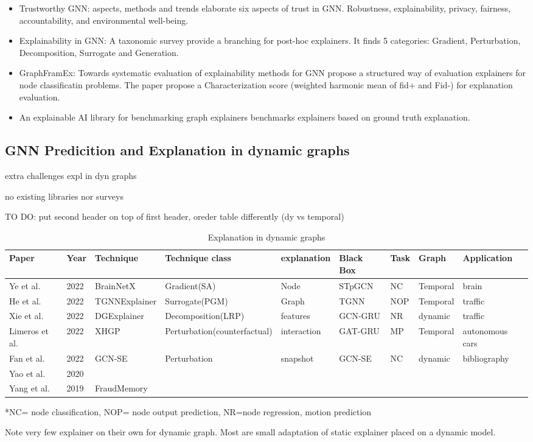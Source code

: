 \begin{itemize}
    
    \item Trustworthy GNN: aspects, methods and trends\cite{trustworthy} elaborate six aspects of trust in GNN. Robustness, explainability, privacy, fairness, accountability, and environmental well-being.
    \item Explainability in GNN: A taxonomic survey \cite{expl_survey} provide a branching for post-hoc explainers. It finds 5 categories: Gradient, Perturbation, Decomposition, Surrogate and Generation.
    \item GraphFramEx: Towards systematic evaluation of explainability methods for GNN\cite{graphframex} propose a structured way of evaluation explainers for node classificatin problems. The paper propose a Characterization score (weighted harmonic mean of fid+ and Fid-) for explanation evaluation.
    \item An explainable AI library for benchmarking graph explainers\cite{explainable_AI} benchmarks explainers based on ground truth explanation.

\end{itemize}


\subsection{GNN Predicition and Explanation in dynamic graphs}
extra challenges expl in dyn graphs

no existing libraries nor surveys

TO DO: put second header on top of first header, oreder table differently (dy vs temporal)

\begin{table}
\caption{Explanation in dynamic graphs}\label{tab1}
\begin{tabular}{|l|l|l|l|l|l|l|l|l|}
\hline
Paper &  Year & Technique & Technique class & explanation & Black Box & Task & Graph & Application \\
\hline
 Ye et al.\cite{BrainNetX}& 2022 & BrainNetX & Gradient(SA) & Node & STpGCN & NC & Temporal & brain \\
 He et al.\cite{PGM}& 2022& TGNNExplainer & Surrogate(PGM) & Graph & TGNN &  NOP & Temporal & traffic\\
 Xie et al.\cite{DGExpl}& 2022 & DGExplainer & Decomposition(LRP) & features & GCN-GRU & NR & dynamic & traffic\\
 Limeros et al.\cite{XHGP}& 2022 & XHGP & Perturbation(counterfactual) & interaction & GAT-GRU & MP &Temporal & autonomous cars\\
 Fan et al.\cite{gcn-se}& 2022 & GCN-SE & Perturbation & snapshot & GCN-SE & NC & dynamic & bibliography\\
 Yao et al.\cite{}& 2020 &  \\
 Yang et al.\cite{FraudMemo}& 2019 & FraudMemory & \\
\hline
\end{tabular}
\end{table}
*NC= node classification, NOP= node output prediction, NR=node regression, motion prediction

Note very few explainer on their own for dynamic graph. Most are small adaptation of static explainer placed on a dynamic model.